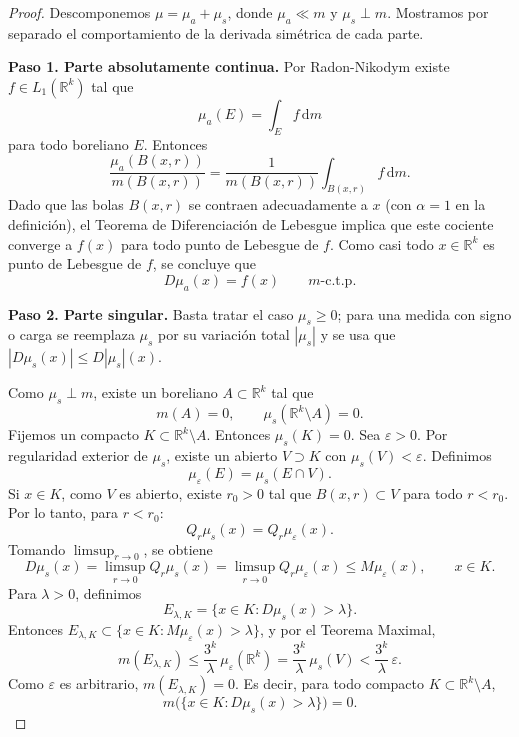 \documentclass[12pt,a4paper]{article}
\theoremstyle{profesional}
\theoremstyle{definicion-style}
\newcommand{\R}{\mathbb{R}}
\begin{document}
\begin{proof}
    Descomponemos \( \mu=\mu_a+\mu_s \), donde \( \mu_a\ll m \) y \( \mu_s\perp m \). Mostramos por separado el comportamiento de la derivada simétrica de cada parte.

    \textbf{Paso 1. Parte absolutamente continua.}
    Por Radon-Nikodym existe \( f\in L_1(\R^k) \) tal que
    \[
        \mu_a(E)=\int_E f\,\mathrm dm
    \]
    para todo boreliano \( E \). Entonces
    \[
        \frac{\mu_a(B(x,r))}{m(B(x,r))}
        =
        \frac{1}{m(B(x,r))}\int_{B(x,r)} f\,\mathrm dm.
    \]
    Dado que las bolas \( B(x,r) \) se contraen adecuadamente a \( x \) (con \( \alpha=1 \) en la definición), el Teorema de Diferenciación de Lebesgue implica que este cociente converge a \( f(x) \) para todo punto de Lebesgue de \( f \). Como casi todo \( x\in\R^k \) es punto de Lebesgue de \( f \), se concluye que
    \[
        D\mu_a(x)=f(x)
        \qquad m\text{-c.t.p.}
    \]

    \textbf{Paso 2. Parte singular.}
    Basta tratar el caso \( \mu_s\ge 0 \); para una medida con signo o carga se reemplaza \( \mu_s \) por su variación total \( |\mu_s| \) y se usa que \( |D\mu_s(x)| \le D|\mu_s|(x) \).

    Como \( \mu_s\perp m \), existe un boreliano \( A \subset \R^k \) tal que
    \[
        m(A)=0,
        \qquad
        \mu_s(\R^k\setminus A)=0.
    \]
    Fijemos un compacto \( K\subset \R^k\setminus A \). Entonces \( \mu_s(K)=0 \). Sea \( \varepsilon>0 \). Por regularidad exterior de \( \mu_s \), existe un abierto \( V\supset K \) con \( \mu_s(V)<\varepsilon \). Definimos
    \[
        \mu_\varepsilon(E)=\mu_s(E\cap V).
    \]
    Si \( x\in K \), como \( V \) es abierto, existe \( r_0>0 \) tal que \( B(x,r)\subset V \) para todo \( r<r_0 \). Por lo tanto, para \( r<r_0 \):
    \[
        Q_r\mu_s(x)=Q_r\mu_\varepsilon(x).
    \]
    Tomando \( \limsup_{r\to 0} \), se obtiene
    \[
        D\mu_s(x) = \limsup_{r\to 0} Q_r\mu_s(x) = \limsup_{r\to 0} Q_r\mu_\varepsilon(x) \le M\mu_\varepsilon(x), \qquad x\in K.
    \]
    Para \( \lambda>0 \), definimos
    \[
        E_{\lambda,K}=\{x\in K: D\mu_s(x)>\lambda \}.
    \]
    Entonces \( E_{\lambda,K}\subset \{x\in K: M\mu_\varepsilon(x)>\lambda \} \), y por el Teorema Maximal,
    \[
        m(E_{\lambda,K}) \le \frac{3^k}{\lambda}\,\mu_\varepsilon(\R^k) = \frac{3^k}{\lambda}\,\mu_s(V) < \frac{3^k}{\lambda}\,\varepsilon.
    \]
    Como \( \varepsilon \) es arbitrario, \( m(E_{\lambda,K})=0 \). Es decir, para todo compacto \( K\subset\R^k\setminus A \),
    \[
        m\big( \{ x \in K: D\mu_s(x) > \lambda \} \big) = 0.
    \]


\end{proof}
\end{document}
